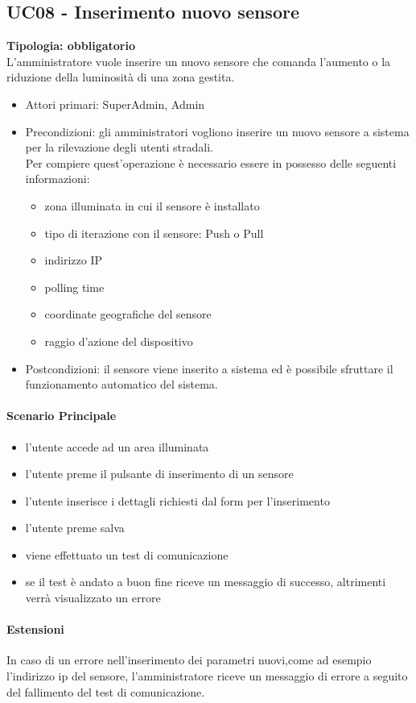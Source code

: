 \documentclass[12pt]{article}
\begin{document}
\subsection{UC08 - Inserimento nuovo sensore}
\textbf{Tipologia: obbligatorio}\\
L'amministratore vuole inserire un nuovo sensore che comanda l'aumento o la riduzione della luminosità di una zona gestita.
\begin{itemize}
	\item Attori primari: SuperAdmin, Admin
	\item Precondizioni: gli amministratori vogliono inserire un nuovo sensore a sistema per la rilevazione degli utenti stradali.\\
	 Per compiere quest'operazione è necessario essere in possesso delle seguenti informazioni: 
	\begin{itemize}
		\item zona illuminata in cui il sensore è installato
		\item tipo di iterazione con il sensore: Push o Pull
		\item indirizzo IP
		\item polling time
		\item coordinate geografiche del sensore
		\item raggio d'azione del dispositivo
	\end{itemize}
	\item Postcondizioni: il sensore viene inserito a sistema ed è possibile sfruttare il funzionamento automatico del sistema.
\end{itemize}
\paragraph{Scenario Principale}
\begin{itemize}
	\item l'utente accede ad un area illuminata
	\item l'utente preme il pulsante di inserimento di un sensore
	\item l'utente inserisce i dettagli richiesti dal form per l'inserimento
	\item l'utente preme salva
	\item viene effettuato un test di comunicazione
	\item se il test è andato a buon fine riceve un messaggio di successo, altrimenti verrà visualizzato un errore
\end{itemize}
\paragraph{Estensioni} In caso di un errore nell'inserimento dei parametri nuovi,come ad esempio l'indirizzo ip del sensore,  l'amministratore riceve un messaggio di errore a seguito del fallimento del test di comunicazione.
\end{document}
